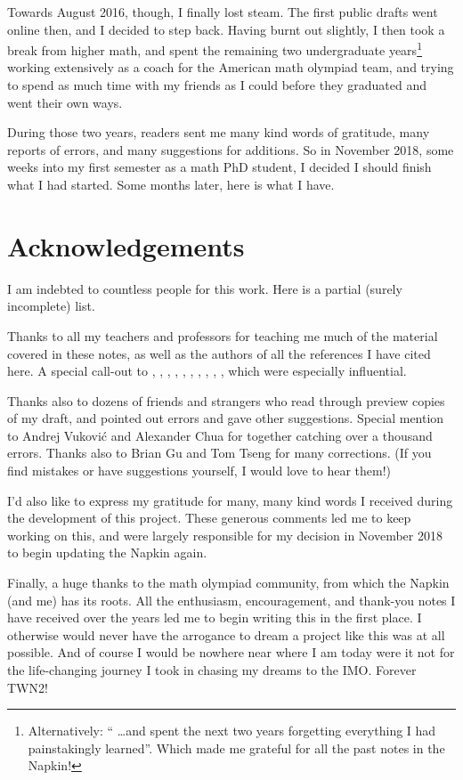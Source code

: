 Towards August 2016, though, I finally lost steam.
The first public drafts went online then, and I decided to step back.
Having burnt out slightly,
I then took a break from higher math,
and spent the remaining two undergraduate years\footnote{Alternatively:
	`` \dots and spent the next two years forgetting everything
	I had painstakingly learned''.
	Which made me grateful for all the past notes in the Napkin!}
working extensively as a coach for the American math olympiad team,
and trying to spend as much time with my friends as I could
before they graduated and went their own ways.

During those two years, readers sent me many kind words of gratitude,
many reports of errors, and many suggestions for additions.
So in November 2018,
some weeks into my first semester as a math PhD student,
I decided I should finish what I had started.
Some months later, here is what I have.

\section*{Acknowledgements}
I am indebted to countless people for this work.
Here is a partial (surely incomplete) list.

\begin{itemize}
\ii Thanks to all my teachers and professors for teaching me much of the
material covered in these notes,
as well as the authors of all the references I have cited here.
A special call-out to \cite{ref:55a}, \cite{ref:msci},
\cite{ref:manifolds}, \cite{ref:gathmann}, \cite{ref:18-435},
\cite{ref:etingof}, \cite{ref:145a}, \cite{ref:vakil},
\cite{ref:pugh}, \cite{ref:gorin},
which were especially influential.

\ii Thanks also to dozens of friends and strangers
who read through preview copies of my draft,
and pointed out errors and gave other suggestions.
Special mention to Andrej Vukovi\'c and Alexander Chua
for together catching over a thousand errors.
Thanks also to Brian Gu and Tom Tseng for many corrections.
(If you find mistakes or have suggestions yourself,
I would love to hear them!)

\ii I'd also like to express my gratitude for
many, many kind words I received
during the development of this project.
These generous comments led me to keep working on this,
and were largely responsible for my decision in November 2018
to begin updating the Napkin again.
\end{itemize}

Finally, a huge thanks to the math olympiad community,
from which the Napkin (and me) has its roots.
All the enthusiasm, encouragement, and thank-you notes I have received
over the years led me to begin writing this in the first place.
I otherwise would never have the arrogance to dream a project like this
was at all possible.
And of course I would be nowhere near where I am today were it not for the
life-changing journey I took in chasing my dreams to the IMO\@.
Forever TWN2!
